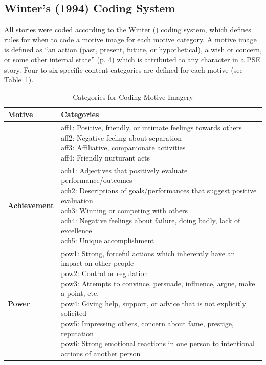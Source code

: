 \documentclass[jou,a4paper]{apa6}\usepackage[]{graphicx}\usepackage[]{color}
\begin{document}
\subsection{Winter's (1994) Coding System}
All stories were coded according to the Winter (\citeyear{winter_ManualScoringMotive_1994}) coding system, which defines rules for when to code a motive image for each motive category. A motive image is defined as ``an action (past, present, future, or hypothetical), a wish or concern, or some other internal state'' (p. 4) which is attributed to any character in a PSE story. Four to six specific content categories are defined for each motive (see Table~\ref{tab:wintercategories}). 


\begin{table}
	\caption{Categories for Coding Motive Imagery \parencite{winter_MeasuringPersonalityDistance_1991,winter_ManualScoringMotive_1994}}
	\label{tab:wintercategories}
	\footnotesize
	\centering
	\begin{tabularx}{\textwidth}{lX}
		\toprule
        Motive & Categories \\
			\midrule
		  \adjustbox{valign=t}{\textbf{Affiliation/Intimacy}} & \makecell[l]{aff1: Positive, friendly, or intimate feelings towards others \\aff2: Negative feeling about separation \\aff3: Affiliative, companionate activities \\aff4: Friendly nurturant acts} \\

			\midrule
      \textbf{Achievement} & \makecell[l]{ach1: Adjectives that positively evaluate performance/outcomes \\ach2: Descriptions of goals/performances that suggest positive evaluation \\ach3: Winning or competing with others \\ach4: Negative feelings about failure, doing badly, lack of excellence \\ach5: Unique accomplishment} \\

			\midrule
      \textbf{Power} & \makecell[l]{pow1: Strong, forceful actions which inherently have an impact on other people \\pow2: Control or regulation \\pow3: Attempts to convince, persuade, influence, argue, make a point, etc. \\pow4: Giving help, support, or advice that is not explicitly solicited \\pow5: Impressing others, concern about fame, prestige, reputation \\pow6: Strong emotional reactions in one person to intentional actions of another person} \\
		\bottomrule
	\end{tabularx}
\end{table}
\end{document}
